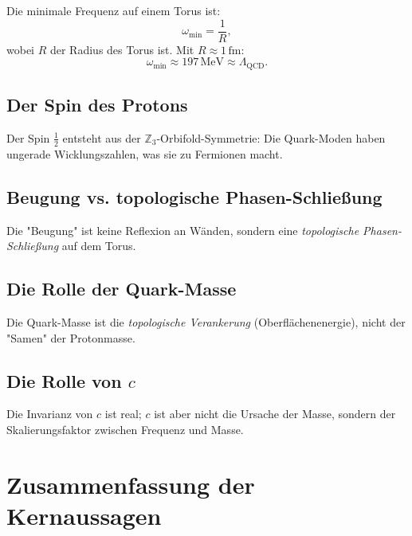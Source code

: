 \documentclass[11pt,a4paper]{article}
\begin{document}
	Die minimale Frequenz auf einem Torus ist:
	\[
	\omega_{\min} = \frac{1}{R},
	\]
	wobei \(R\) der Radius des Torus ist. Mit \(R \approx 1\,\text{fm}\):
	\[
	\omega_{\min} \approx 197\,\text{MeV} \approx \Lambda_{\text{QCD}}.
	\]
	
	\subsection{Der Spin des Protons}
	
	Der Spin \(\frac{1}{2}\) entsteht aus der \(\mathbb{Z}_3\)-Orbifold-Symmetrie: 
	Die Quark-Moden haben ungerade Wicklungszahlen, was sie zu Fermionen macht.
	
	\subsection{Beugung vs. topologische Phasen-Schließung}
	
	Die "Beugung" ist keine Reflexion an Wänden, sondern eine \emph{topologische Phasen-Schließung} auf dem Torus.
	
	\subsection{Die Rolle der Quark-Masse}
	
	Die Quark-Masse ist die \emph{topologische Verankerung} (Oberflächenenergie), nicht der "Samen" der Protonmasse.
	
	\subsection{Die Rolle von \(c\)}
	
	Die Invarianz von \(c\) ist real; \(c\) ist aber nicht die Ursache der Masse, sondern der Skalierungsfaktor zwischen Frequenz und Masse.
	
	\section{Zusammenfassung der Kernaussagen}
	
\end{document}

